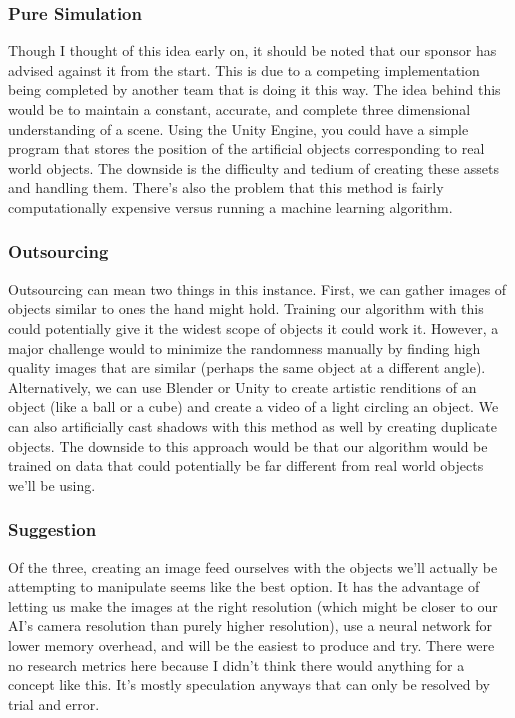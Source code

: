 \documentclass[10pt,journal,compsoc, draftclsnofoot,onecolumn]{IEEEtran}
\begin{document}
\subsubsection{Pure Simulation}
Though I thought of this idea early on, it should be noted that our sponsor has advised against it from the start.
This is due to a competing implementation being completed by another team that is doing it this way.
The idea behind this would be to maintain a constant, accurate, and complete three dimensional understanding of a scene.
Using the Unity Engine, you could have a simple program that stores the position of the artificial objects corresponding to real world objects.
The downside is the difficulty and tedium of creating these assets and handling them.
There's also the problem that this method is fairly computationally expensive versus running a machine learning algorithm.

\subsubsection{Outsourcing}
Outsourcing can mean two things in this instance.
First, we can gather images of objects similar to ones the hand might hold.
Training our algorithm with this could potentially give it the widest scope of objects it could work it.
However, a major challenge would to minimize the randomness manually by finding high quality images that are similar (perhaps the same object at a different angle).
Alternatively, we can use Blender or Unity to create artistic renditions of an object (like a ball or a cube) and create a video of a light circling an object.
We can also artificially cast shadows with this method as well by creating duplicate objects.
The downside to this approach would be that our algorithm would be trained on data that could potentially be far different from real world objects we'll be using.

\subsubsection{Suggestion}
Of the three, creating an image feed ourselves with the objects we'll actually be attempting to manipulate seems like the best option.
It has the advantage of letting us make the images at the right resolution (which might be closer to our AI's camera resolution than purely higher resolution), use a neural network for lower memory overhead, and will be the easiest to produce and try.
There were no research metrics here because I didn't think there would anything for a concept like this.
It's mostly speculation anyways that can only be resolved by trial and error.
\end{document}
